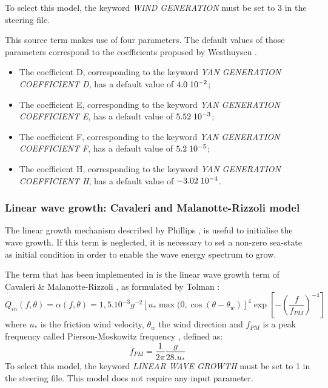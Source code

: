 To select this model, the keyword \textit{WIND GENERATION} must be set to 3 in
the steering file.

 This source term makes use of four parameters. The default values of those parameters correspond to the coefficients proposed by Westhuysen \cite{Westhuys2007}.

\begin{itemize}
\item  The coefficient D, corresponding to the keyword \textit{YAN GENERATION
  COEFFICIENT D}, has a default value of $4.0\hspace{0.1cm} 10^{-2}$;
\item  The coefficient E, corresponding to the keyword \textit{YAN GENERATION
  COEFFICIENT E}, has a default value of $5.52\hspace{0.1cm} 10^{-3}$;
\item  The coefficient F, corresponding to the keyword \textit{YAN GENERATION
  COEFFICIENT F}, has a default value of $5.2\hspace{0.1cm} 10^{-5}$;
\item  The coefficient H, corresponding to the keyword \textit{YAN GENERATION
  COEFFICIENT H}, has a default value of $-3.02\hspace{0.1cm} 10^{-4}$.
\end{itemize}

\subsubsection{Linear wave growth: Cavaleri and Malanotte-Rizzoli model}
\label{parag4.3.2.4}

The linear growth mechanism described by Phillips \cite{Phillips1957},
\cite{Phillips1958} is useful to initialise the wave growth. If this term is
neglected, it is necessary to set a non-zero sea-state as initial condition
in order to enable the wave energy spectrum to grow.

The term that has been implemented in \tomawac is the linear wave growth term
of Cavaleri \& Malanotte-Rizzoli \cite{Cavaleri1981}, as formulated by Tolman
\cite{Tolman1992}:
\begin{equation} \label{GrindEQ__4_35_}
  Q_{in} (f,\theta )=\alpha (f,\theta )=1,5.10^{-3} g^{-2} \left[u_{*}
    \max (0,\cos \left(\theta -\theta _{w} \right)\right]^{4} \exp
  \left[-\left(\frac{f}{f_{PM} } \right)^{-4} \right]
\end{equation}
where $u_*$ is the friction wind velocity, ${\theta}_{w}$ the wind direction
and ${f}_{PM}$ is a peak frequency called Pierson-Moskowitz frequency
\cite{Pierson1964}, defined as:
\begin{equation} \label{GrindEQ__4_36_}
f_{PM} =\frac{1}{2\pi } \frac{g}{28.u_{*} }
\end{equation}
To select this model, the keyword \textit{LINEAR WAVE GROWTH} must be set to
1 in the steering file. This model does not require any input parameter.

